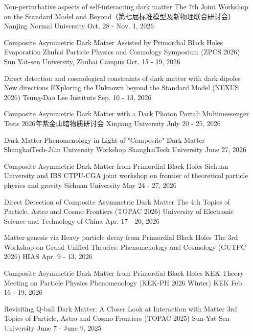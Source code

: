\begin{talklist}

\talkentry
  {Non-perturbative aspects of self-interacting dark matter}
  {The 7th Joint Workshop on the Standard Model and Beyond（第七届标准模型及新物理联合研讨会）}
  {Nanjing Normal University}
  {Oct. 28 - Nov. 1, 2026}
  {}

\talkentry
  {Composite Asymmetric Dark Matter Assisted by Primordial Black Holes Evaporation}
  {Zhuhai Particle Physics and Cosmology Symposium (ZPCS 2026)}
  {Sun Yat-sen University, Zhuhai Campus}
  {Oct. 15 - 19, 2026}
  {}

\talkentry
  {Direct detection and cosmological constraints of dark matter with dark dipoles}
  {New directions EXploring the Unknown beyond the Standard Model (NEXUS 2026)}
  {Tsung-Dao Lee Institute}
  {Sep. 10 - 13, 2026}
  {}

\talkentry
  {Composite Asymmetric Dark Matter with a Dark Photon Portal: Multimessenger Tests}
  {2026年紫金山暗物质研讨会}
  {Xinjiang University}
  {July 20 - 25, 2026}
  {}

\talkentry
  {Dark Matter Phenomenology in Light of "Composite" Dark Matter}
  {ShanghaiTech-Jilin University Workshop}
  {ShanghaiTech University}
  {June 27, 2026}
  {}

\talkentry
  {Composite Asymmetric Dark Matter from Primordial Black Holes}
  {Sichuan University and IBS CTPU-CGA joint workshop on frontier of theoretical particle physics and gravity}
  {Sichuan University}
  {May 24 - 27, 2026}
  {}

\talkentry
  {Direct Detection of Composite Asymmetric Dark Matter}
  {The 4th Topics of Particle, Astro and Cosmo Frontiers (TOPAC 2026)}
  {University of Electronic Science and Technology of China}
  {Apr. 17 - 20, 2026}
  {}

\talkentry
  {Matter-genesis via Heavy particle decay from Primordial Black Holes}
  {The 3rd Workshop on Grand Unified Theories: Phenomenology and Cosmology (GUTPC 2026)}
  {HIAS}
  {Apr. 9 - 13, 2026}
  {}

\talkentry
  {Composite Asymmetric Dark Matter from Primordial Black Holes}
  {KEK Theory Meeting on Particle Physics Phenomenology (KEK-PH 2026 Winter)}
  {KEK}
  {Feb. 16 - 19, 2026}
  {}

\talkentry
  {Revisiting Q-ball Dark Matter: A Closer Look at Interaction with Matter}
  {3rd Topics of Particle, Astro and Cosmo Frontiers (TOPAC 2025)}
  {Sun-Yat Sen University}
  {June 7 - June 9, 2025}
  {}


\end{talklist}
